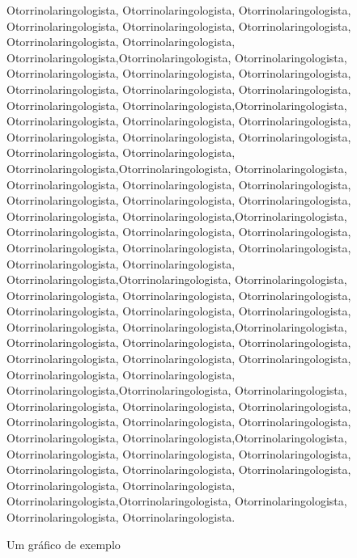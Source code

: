 Otorrinolaringologista, Otorrinolaringologista, Otorrinolaringologista, Otorrinolaringologista, Otorrinolaringologista, Otorrinolaringologista, Otorrinolaringologista, Otorrinolaringologista, Otorrinolaringologista,Otorrinolaringologista, Otorrinolaringologista, Otorrinolaringologista, Otorrinolaringologista, Otorrinolaringologista, Otorrinolaringologista, Otorrinolaringologista, Otorrinolaringologista, Otorrinolaringologista, Otorrinolaringologista,Otorrinolaringologista, Otorrinolaringologista, Otorrinolaringologista, Otorrinolaringologista, Otorrinolaringologista, Otorrinolaringologista, Otorrinolaringologista, Otorrinolaringologista, Otorrinolaringologista, Otorrinolaringologista,Otorrinolaringologista, Otorrinolaringologista, Otorrinolaringologista, Otorrinolaringologista, Otorrinolaringologista, Otorrinolaringologista, Otorrinolaringologista, Otorrinolaringologista, Otorrinolaringologista, Otorrinolaringologista,Otorrinolaringologista, Otorrinolaringologista, Otorrinolaringologista, Otorrinolaringologista, Otorrinolaringologista, Otorrinolaringologista, Otorrinolaringologista, Otorrinolaringologista, Otorrinolaringologista, Otorrinolaringologista,Otorrinolaringologista, Otorrinolaringologista, Otorrinolaringologista, Otorrinolaringologista, Otorrinolaringologista, Otorrinolaringologista, Otorrinolaringologista, Otorrinolaringologista, Otorrinolaringologista, Otorrinolaringologista,Otorrinolaringologista, Otorrinolaringologista, Otorrinolaringologista, Otorrinolaringologista, Otorrinolaringologista, Otorrinolaringologista, Otorrinolaringologista, Otorrinolaringologista, Otorrinolaringologista, Otorrinolaringologista,Otorrinolaringologista, Otorrinolaringologista, Otorrinolaringologista, Otorrinolaringologista, Otorrinolaringologista, Otorrinolaringologista, Otorrinolaringologista, Otorrinolaringologista, Otorrinolaringologista, Otorrinolaringologista,Otorrinolaringologista, Otorrinolaringologista, Otorrinolaringologista, Otorrinolaringologista, Otorrinolaringologista, Otorrinolaringologista, Otorrinolaringologista, Otorrinolaringologista, Otorrinolaringologista, Otorrinolaringologista,Otorrinolaringologista, Otorrinolaringologista, Otorrinolaringologista, Otorrinolaringologista.

\begin{grafico}[!hbt]
  \centering
  \caption{Um gráfico de exemplo}
  \label{grafico-exemplo}
\end{grafico}
